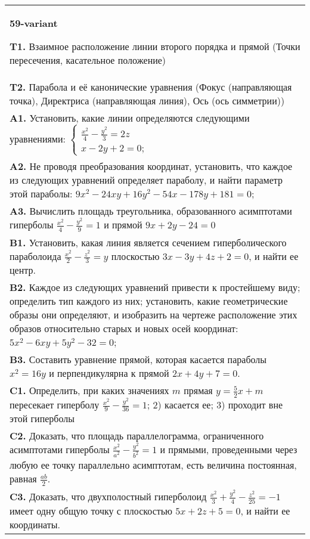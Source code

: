 \documentclass{article}
\begin{document}
\begin{tabular}{m{17cm}}
\textbf{59-variant}
\newline

\textbf{T1.} Взаимное расположение линии второго порядка и прямой (Точки пересечения, касательное положение) \\
\textbf{T2.} Парабола и её канонические уравнения (Фокус (направляющая точка), Директриса (направляющая линия), Ось (ось симметрии)) \\
\textbf{A1.} Установить, какие линии определяются следующими уравнениями: $\left\{\begin{array}{l}\frac{x^2}{4}-\frac{y^2}{3}=2 z \\ x-2 y+2=0 ;\end{array}\right.$ \\
\textbf{A2.} Не проводя преобразования координат, установить, что каждое из следующих уравнений определяет параболу, и найти параметр этой параболы: $9 x^2-24 x y+16 y^2-54 x-178 y+181=0$; \\
\textbf{A3.} Вычислить площадь треугольника, образованного асимптотами гиперболы $\frac{x^2}{4}-\frac{y^2}{9}=1$ и прямой $9 x+2 y-24=0$ \\
\textbf{B1.} Установить, какая линия является сечением гиперболического параболоида $\frac{x^2}{2}-\frac{z^2}{3}=y$ плоскостью $3 x-3 y+4 z+2=0$, и найти ее центр. \\
\textbf{B2.} Каждое из следующих уравнений привести к простейшему виду; определить тип каждого из них; установить, какие геометрические образы они определяют, и изобразить на чертеже расположение этих образов относительно старых и новых осей координат: $5 x^2-6 x y+5 y^2-32=0$; \\
\textbf{B3.} Составить уравнение прямой, которая касается параболы $x^2=16 y$ и перпендикулярна к прямой $2 x+4 y+7=0$. \\
\textbf{C1.} Определить, при каких значениях $m$ прямая $y=\frac{5}{2} x+m$ пересекает гиперболу $\frac{x^2}{9}-\frac{y^2}{36}=1$; 2) касается ее; 3) проходит вне этой гиперболы \\
\textbf{C2.} Доказать, что площадь параллелограмма, ограниченного асимптотами гиперболы $\frac{x^2}{a^2}-\frac{y^2}{b^2}=1$ и прямыми, проведенными через любую ее точку параллельно асимптотам, есть величина постоянная, равная $\frac{a b}{2}$. \\
\textbf{C3.} Доказать, что двухполостный гиперболоид $\frac{x^2}{3}+\frac{y^2}{4}-\frac{z^2}{25}=-1$ имеет одну общую точку с плоскостью $5 x+2 z+5=0$, и найти ее координаты. \\

\end{tabular}
\vspace{1cm}
\end{document}
